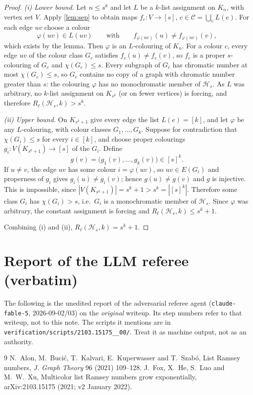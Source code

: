 \documentclass[11pt,a4paper]{article}
\theoremstyle{plain}
\theoremstyle{definition}
\theoremstyle{remark}
\newcommand{\cH}{\mathcal H}
\newcommand{\cC}{\mathcal C}
\newcommand{\Rl}{R_{\ell}}
\begin{document}
\label{pf:main}
\thmmain*
\begin{proof}
\emph{(i) Lower bound.} Let $n\le s^k$ and let $L$ be a $k$-list assignment on $K_n$, with vertex set $V$. Apply \cref{lem:sep} to obtain maps $f_c:V\to[s]$, $c\in\cC=\bigcup_eL(e)$. For each edge $uv$ choose a colour
\[
 \varphi(uv)\in L(uv)\qquad\text{with}\qquad f_{\varphi(uv)}(u)\ne f_{\varphi(uv)}(v),
\]
which exists by the lemma. Then $\varphi$ is an $L$-colouring of $K_n$. For a colour $c$, every edge $uv$ of the colour class $G_c$ satisfies $f_c(u)\ne f_c(v)$, so $f_c$ is a proper $s$-colouring of $G_c$ and $\chi(G_c)\le s$. Every subgraph of $G_c$ has chromatic number at most $\chi(G_c)\le s$, so $G_c$ contains no copy of a graph with chromatic number greater than $s$: the colouring $\varphi$ has no monochromatic member of $\cH_s$. As $L$ was arbitrary, no $k$-list assignment on $K_{s^k}$ (or on fewer vertices) is forcing, and therefore $\Rl(\cH_s,k)>s^k$.

\emph{(ii) Upper bound.} On $K_{s^k+1}$ give every edge the list $L(e)=[k]$, and let $\varphi$ be any $L$-colouring, with colour classes $G_1,\dots,G_k$. Suppose for contradiction that $\chi(G_i)\le s$ for every $i\in[k]$, and choose proper colourings $g_i:V(K_{s^k+1})\to[s]$ of the $G_i$. Define
\[
 g(v)=\bigl(g_1(v),\dots,g_k(v)\bigr)\in[s]^k.
\]
If $u\ne v$, the edge $uv$ has some colour $i=\varphi(uv)$, so $uv\in E(G_i)$ and properness of $g_i$ gives $g_i(u)\ne g_i(v)$; hence $g(u)\ne g(v)$ and $g$ is injective. This is impossible, since $|V(K_{s^k+1})|=s^k+1>s^k=|[s]^k|$. Therefore some class $G_i$ has $\chi(G_i)>s$, i.e.\ $G_i$ is a monochromatic member of $\cH_s$. Since $\varphi$ was arbitrary, the constant assignment is forcing and $\Rl(\cH_s,k)\le s^k+1$.

Combining (i) and (ii), $\Rl(\cH_s,k)=s^k+1$.
\end{proof}

\section{Report of the LLM referee (verbatim)}\label{app:referee}

\begin{tcolorbox}[colback=gray!8,colframe=gray!50,boxrule=0.4pt,arc=2pt]
\small The following is the unedited report of the adversarial referee agent (\texttt{claude-fable-5}, 2026-09-02/03) on the \emph{original} writeup. Its step numbers refer to that writeup, not to this note. The scripts it mentions are in \texttt{verification/scripts/2103.15175\_\_00/}. Treat it as machine output, not as an authority.
\end{tcolorbox}



\begin{thebibliography}{9}
 N.~Alon, M.~Bucić, T.~Kalvari, E.~Kuperwasser and T.~Szabó, List Ramsey numbers, \emph{J. Graph Theory} 96 (2021) 109--128.
 J.~Fox, X.~He, S.~Luo and M.~W.~Xu, Multicolor list Ramsey numbers grow exponentially, arXiv:2103.15175 (2021; v2 January 2022).
\end{thebibliography}
\end{document}

